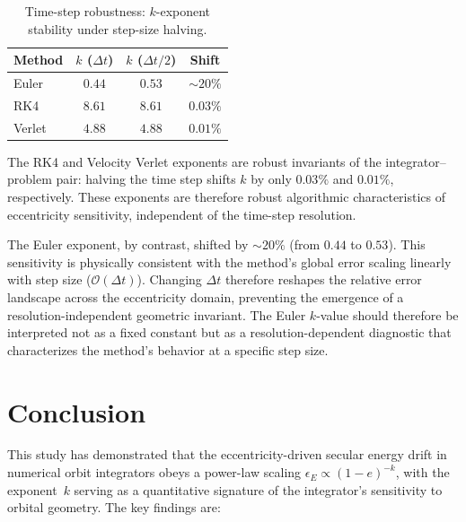 \documentclass[twocolumn, 10pt]{article}
\begin{document}
\begin{table}[H]
\centering
\caption{Time-step robustness: $k$-exponent stability under step-size halving.}
\label{tab:robustness}
\begin{tabular}{@{}lccc@{}}
\toprule
Method & $k$ ($\Delta t$) & $k$ ($\Delta t/2$) & Shift \\
\midrule
Euler  & $0.44$ & $0.53$ & ${\sim}20\%$ \\
RK4    & $8.61$ & $8.61$ & $0.03\%$ \\
Verlet & $4.88$ & $4.88$ & $0.01\%$ \\
\bottomrule
\end{tabular}
\end{table}

The RK4 and Velocity Verlet exponents are robust invariants of the integrator--problem pair: halving the time step shifts $k$ by only $0.03\%$ and $0.01\%$, respectively. These exponents are therefore robust algorithmic characteristics of eccentricity sensitivity, independent of the time-step resolution.

The Euler exponent, by contrast, shifted by ${\sim}20\%$ (from $0.44$ to $0.53$). This sensitivity is physically consistent with the method's global error scaling linearly with step size ($\mathcal{O}(\Delta t)$). Changing $\Delta t$ therefore reshapes the relative error landscape across the eccentricity domain, preventing the emergence of a resolution-independent geometric invariant. The Euler $k$-value should therefore be interpreted not as a fixed constant but as a resolution-dependent diagnostic that characterizes the method's behavior at a specific step size.

\section{Conclusion}

This study has demonstrated that the eccentricity-driven secular energy drift in numerical orbit integrators obeys a power-law scaling $\epsilon_E \propto (1-e)^{-k}$, with the exponent~$k$ serving as a quantitative signature of the integrator's sensitivity to orbital geometry. The key findings are:
\end{document}

